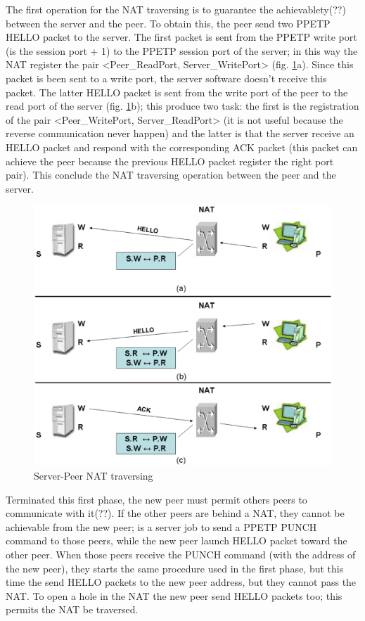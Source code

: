The first operation for the NAT traversing is to guarantee the achievablety(??) between the server and the peer. To obtain this, the peer send two PPETP HELLO packet to the server. The first packet is sent from the PPETP write port (is the session port + 1) to the PPETP session port of the server; in this way the NAT register the pair <Peer\_ReadPort, Server\_WritePort> (fig. \ref{fig:first_phase}a). Since this packet is been sent to a write port, the server software doesn't receive this packet. The latter HELLO packet is sent from the write port of the peer to the read port of the server (fig. \ref{fig:first_phase}b); this produce two task: the first is the registration of the pair <Peer\_WritePort, Server\_ReadPort> (it is not useful because the reverse communication never happen) and the latter is that the server receive an HELLO packet and respond with the corresponding ACK packet (this packet can achieve the peer because the previous HELLO packet register the right port pair). This conclude the NAT traversing operation between the peer and the server.
\begin{figure}[htbp]
	\centering
		\includegraphics[scale=0.4]{first_phase.eps}
	\caption[Server-Peer NAT traversing]{Server-Peer NAT traversing}
	\label{fig:first_phase}
\end{figure}

Terminated this first phase, the new peer must permit others peers to communicate with it(??). If  the other peers are behind a NAT, they cannot be achievable from the new peer; is a server job to send a PPETP PUNCH command to those peers, while the new peer launch HELLO packet toward the other peer. When those peers receive the PUNCH command (with the address of the new peer), they starts the same procedure used in the first phase, but this time the send HELLO packets to the new peer address, but they cannot pass the NAT. To open a hole in the NAT the new peer send HELLO packets too; this permits the NAT be traversed.